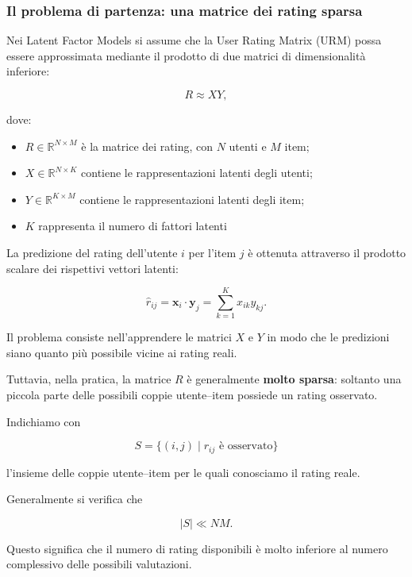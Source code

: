 \subsubsection{Il problema di partenza: una matrice dei rating sparsa}

Nei Latent Factor Models si assume che la User Rating Matrix
(URM) possa essere approssimata mediante il prodotto di due
matrici di dimensionalità inferiore:

\[
R \approx XY,
\]

dove:

\begin{itemize}
    \item $R \in \mathbb{R}^{N \times M}$ è la matrice
    dei rating, con $N$ utenti e $M$ item;

    \item $X \in \mathbb{R}^{N \times K}$ contiene
    le rappresentazioni latenti degli utenti;

    \item $Y \in \mathbb{R}^{K \times M}$ contiene
    le rappresentazioni latenti degli item;

    \item $K$ rappresenta il numero di fattori latenti
\end{itemize}

La predizione del rating dell'utente $i$ per l'item $j$
è ottenuta attraverso il prodotto scalare dei rispettivi
vettori latenti:

\[
\widehat{r}_{ij}
=
\mathbf{x}_i \cdot \mathbf{y}_j
=
\sum_{k=1}^{K}x_{ik}y_{kj}.
\]

Il problema consiste nell'apprendere le matrici $X$ e $Y$
in modo che le predizioni siano quanto più possibile
vicine ai rating reali.

Tuttavia, nella pratica, la matrice $R$ è generalmente
\textbf{molto sparsa}: soltanto una piccola parte delle
possibili coppie utente--item possiede un rating osservato.

Indichiamo con

\[
S =
\{(i,j) \mid r_{ij} \text{ è osservato}\}
\]

l'insieme delle coppie utente--item per le quali
conosciamo il rating reale.

Generalmente si verifica che

\[
|S| \ll NM.
\]

Questo significa che il numero di rating disponibili
è molto inferiore al numero complessivo delle possibili
valutazioni.

